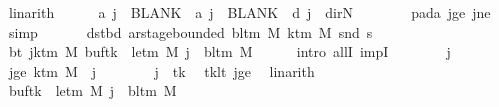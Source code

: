 \begin{isabellebody}
\ linarith\isanewline
\ \ \ \ \isamarkupfalse%
\ {\isachardoublequoteopen}{\isacharquery}{\kern0pt}a\ j\ {\isacharequal}{\kern0pt}\ BLANK{}\ {\isasymand}\ {\isacharquery}{\kern0pt}a\ j\ {\isacharequal}{\kern0pt}\ BLANK{}\ {\isasymand}\ {\isacharquery}{\kern0pt}d\ j\ {\isacharequal}{\kern0pt}\ dir{\isachardot}{\kern0pt}N{\isachardoublequoteclose}\isanewline
\ \ \ \ \ \ \isamarkupfalse%
\ pad{\isacharunderscore}{\kern0pt}a\ jge\ jne\ \isamarkupfalse%
\ simp\isanewline
\ \ \isamarkupfalse%
\isanewline
\ \ \isamarkupfalse%
\ dst{\isacharunderscore}{\kern0pt}bd{\isacharcolon}{\kern0pt}\ {\isachardoublequoteopen}ar{\isacharunderscore}{\kern0pt}stage{\isacharunderscore}{\kern0pt}bounded\ {\isacharparenleft}{\kern0pt}bl{\isacharunderscore}{\kern0pt}tm\ M{\isacharparenright}{\kern0pt}\ {\isacharparenleft}{\kern0pt}k{\isacharunderscore}{\kern0pt}tm\ M{\isacharparenright}{\kern0pt}\ {\isacharparenleft}{\kern0pt}snd\ {\isacharquery}{\kern0pt}s{\isacharprime}{\kern0pt}{\isacharparenright}{\kern0pt}{\isachardoublequoteclose}\isanewline
\ \ \isamarkupfalse%
\ {\isacharminus}{\kern0pt}\isanewline
\ \ \ \ \isamarkupfalse%
\ bt{\isacharcolon}{\kern0pt}\ {\isachardoublequoteopen}{\isasymforall}j{\isasymge}k{\isacharunderscore}{\kern0pt}tm\ M{\isachardot}{\kern0pt}\ {\isacharparenleft}{\kern0pt}buf{\isacharparenleft}{\kern0pt}tk\ {\isacharcolon}{\kern0pt}{\isacharequal}{\kern0pt}\ le{\isacharunderscore}{\kern0pt}tm\ M{\isacharparenright}{\kern0pt}{\isacharparenright}{\kern0pt}\ j\ {\isacharequal}{\kern0pt}\ bl{\isacharunderscore}{\kern0pt}tm\ M{\isachardoublequoteclose}\isanewline
\ \ \ \ \isamarkupfalse%
\ {\isacharparenleft}{\kern0pt}intro\ allI\ impI{\isacharparenright}{\kern0pt}\isanewline
\ \ \ \ \ \ \isamarkupfalse%
\ j\ \isamarkupfalse%
\ jge{\isacharcolon}{\kern0pt}\ {\isachardoublequoteopen}k{\isacharunderscore}{\kern0pt}tm\ M\ {\isasymle}\ j{\isachardoublequoteclose}\isanewline
\ \ \ \ \ \ \isamarkupfalse%
\ {\isachardoublequoteopen}j\ {\isasymnoteq}\ tk{\isachardoublequoteclose}\ \isamarkupfalse%
\ tk{\isacharunderscore}{\kern0pt}lt\ jge\ \isamarkupfalse%
\ linarith\isanewline
\ \ \ \ \ \ \isamarkupfalse%
\ {\isachardoublequoteopen}{\isacharparenleft}{\kern0pt}buf{\isacharparenleft}{\kern0pt}tk\ {\isacharcolon}{\kern0pt}{\isacharequal}{\kern0pt}\ le{\isacharunderscore}{\kern0pt}tm\ M{\isacharparenright}{\kern0pt}{\isacharparenright}{\kern0pt}\ j\ {\isacharequal}{\kern0pt}\ bl{\isacharunderscore}{\kern0pt}tm\ M{\isachardoublequoteclose}\isanewline

\end{isabellebody}
